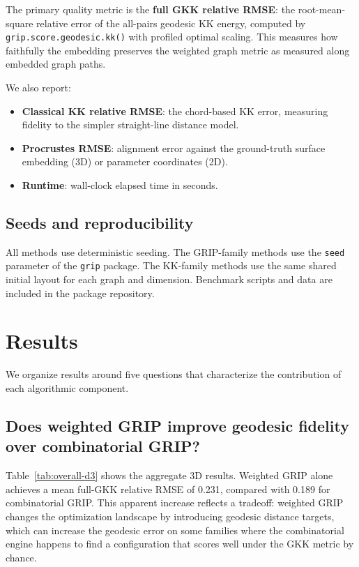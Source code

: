 \documentclass[11pt,twocolumn]{article}
\newcommand{\grip}{\texttt{grip}}
\begin{document}
The primary quality metric is the \textbf{full GKK relative RMSE}: the
root-mean-square relative error of the all-pairs geodesic KK energy,
computed by \texttt{grip.score.geodesic.kk()} with profiled optimal
scaling.  This measures how faithfully the embedding preserves the
weighted graph metric as measured along embedded graph paths.

We also report:
\begin{itemize}
\item \textbf{Classical KK relative RMSE}: the chord-based KK error,
  measuring fidelity to the simpler straight-line distance model.
\item \textbf{Procrustes RMSE}: alignment error against the ground-truth
  surface embedding (3D) or parameter coordinates (2D).
\item \textbf{Runtime}: wall-clock elapsed time in seconds.
\end{itemize}

\subsection{Seeds and reproducibility}

All methods use deterministic seeding.  The GRIP-family methods use the
\texttt{seed} parameter of the \grip{} package.  The KK-family methods
use the same shared initial layout for each graph and dimension.
Benchmark scripts and data are included in the package repository.


\section{Results}\label{sec:results}

We organize results around five questions that characterize the
contribution of each algorithmic component.

\subsection{Does weighted GRIP improve geodesic fidelity over
combinatorial GRIP?}

Table~\ref{tab:overall-d3} shows the aggregate 3D results.  Weighted
GRIP alone achieves a mean full-GKK relative RMSE of 0.231, compared
with 0.189 for combinatorial GRIP.  This apparent increase reflects a
tradeoff: weighted GRIP changes the optimization landscape by introducing
geodesic distance targets, which can increase the geodesic error on some
families where the combinatorial engine happens to find a configuration
that scores well under the GKK metric by chance.
\end{document}
